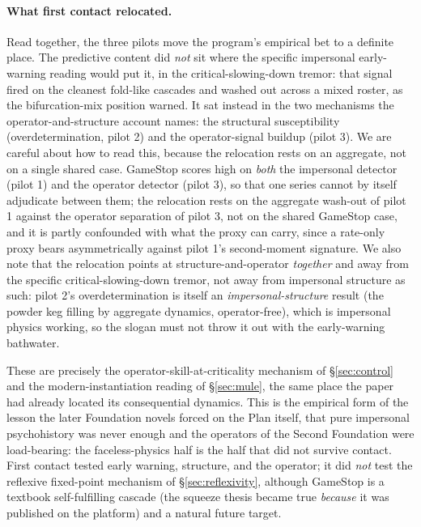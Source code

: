\documentclass[11pt]{article}
\begin{document}
\paragraph{What first contact relocated.} Read together, the three pilots move the program's empirical bet to a definite place. The predictive content did \emph{not} sit where the specific impersonal early-warning reading would put it, in the critical-slowing-down tremor: that signal fired on the cleanest fold-like cascades and washed out across a mixed roster, as the bifurcation-mix position warned. It sat instead in the two mechanisms the operator-and-structure account names: the structural susceptibility (overdetermination, pilot 2) and the operator-signal buildup (pilot 3). We are careful about how to read this, because the relocation rests on an aggregate, not on a single shared case. GameStop scores high on \emph{both} the impersonal detector (pilot 1) and the operator detector (pilot 3), so that one series cannot by itself adjudicate between them; the relocation rests on the aggregate wash-out of pilot 1 against the operator separation of pilot 3, not on the shared GameStop case, and it is partly confounded with what the proxy can carry, since a rate-only proxy bears asymmetrically against pilot 1's second-moment signature. We also note that the relocation points at structure-and-operator \emph{together} and away from the specific critical-slowing-down tremor, not away from impersonal structure as such: pilot 2's overdetermination is itself an \emph{impersonal-structure} result (the powder keg filling by aggregate dynamics, operator-free), which is impersonal physics working, so the slogan must not throw it out with the early-warning bathwater.

These are precisely the operator-skill-at-criticality mechanism of \S\ref{sec:control} and the modern-instantiation reading of \S\ref{sec:mule}, the same place the paper had already located its consequential dynamics. This is the empirical form of the lesson the later Foundation novels forced on the Plan itself, that pure impersonal psychohistory was never enough and the operators of the Second Foundation were load-bearing: the faceless-physics half is the half that did not survive contact. First contact tested early warning, structure, and the operator; it did \emph{not} test the reflexive fixed-point mechanism of \S\ref{sec:reflexivity}, although GameStop is a textbook self-fulfilling cascade (the squeeze thesis became true \emph{because} it was published on the platform) and a natural future target.
\end{document}
